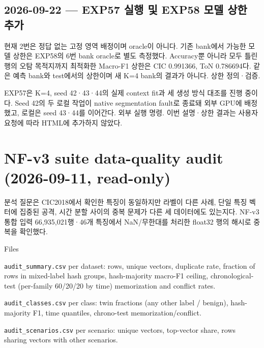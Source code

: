 \subsection{2026-09-22 — EXP57 실행 및 EXP58 모델 상한 추가}
현재 2번은 정답 없는 고정 영역 배정이며 oracle이 아니다. 기존 bank에서 가능한 모델 상한은 EXP58의 6번 bank oracle로 별도 측정했다. Accuracy뿐 아니라 모두 틀린 행의 오탐 목적지까지 최적화한 Macro-F1 상한은 CIC 0.991366, ToN 0.786694다. 같은 예측 bank와 test에서의 상한이며 새 K=\allowbreak{}4 bank의 결과가 아니다. 상한 정의·검증.

EXP57은 K=\allowbreak{}4, seed 42·43·44의 실제 context fit과 세 생성 방식 대조를 진행 중이다. Seed 42의 두 로컬 작업이 native segmentation fault로 종료돼 외부 GPU에 배정했고, 로컬은 seed 43·44를 이어간다. 외부 실행 명령. 이번 설명·상한 결과는 사용자 요청에 따라 HTML에 추가하지 않았다.



\section{NF-v3 suite data-quality audit (2026-09-11, read-only)}
분석 질문은 CIC2018에서 확인한 특징이 동일하지만 라벨이 다른 사례, 단일 특징 벡터에 집중된 공격, 시간 분할 사이의 중복 문제가 다른 세 데이터에도 있는지다. NF-v3 통합 입력 66,935,021행·46개 특징에서 NaN/무한대를 처리한 float32 행의 해시로 중복을 확인했다.

Files

\par\noindent \textbullet\enspace \texttt{audit\_\allowbreak{}\allowbreak{}su\allowbreak{}mmary.\allowbreak{}cs\allowbreak{}v} per dataset: rows, unique vectors, duplicate rate, fraction of rows in mixed-label hash groups, hash-majority macro-F1 ceiling, chronological-test (per-family 60/\allowbreak{}20/\allowbreak{}20 by time) memorization and conflict rates.


\par\noindent \textbullet\enspace \texttt{audit\_\allowbreak{}\allowbreak{}cl\allowbreak{}asses.\allowbreak{}cs\allowbreak{}v} per class: twin fractions (any other label /\allowbreak{} benign), hash-majority F1, time quantiles, chrono-test memorization/\allowbreak{}conflict.


\par\noindent \textbullet\enspace \texttt{audit\_\allowbreak{}\allowbreak{}sc\allowbreak{}enarios.\allowbreak{}csv} per scenario: unique vectors, top-vector share, rows sharing vectors with other scenarios.


